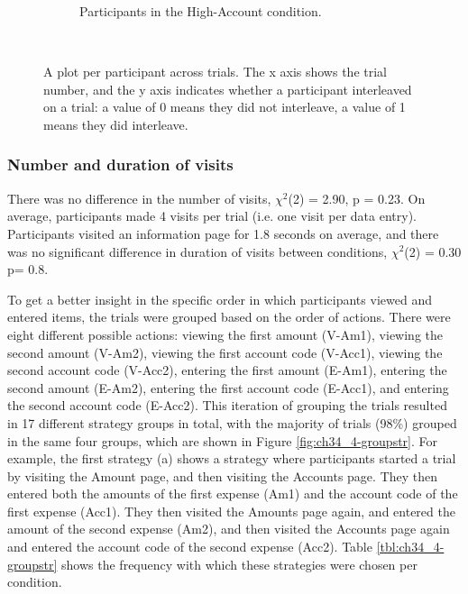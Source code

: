 \begin{figure}[!htbp]
\begin{subfigure}[b]{0.5\textwidth}
        \caption{Participants in the High-Account condition.}
    \end{subfigure}
    ~ %
    \caption{A plot per participant across trials. The x axis shows the trial number, and the y axis indicates whether a participant interleaved on a trial: a value of 0 means they did not interleave, a value of 1 means they did interleave.}\label{fig:ch34_4-plotpp}
\end{figure}

\subsubsection{Number and duration of visits}
There was no difference in the number of visits, $\chi^2$(2) = 2.90, p = 0.23. On average, participants made 4 visits per trial (i.e. one visit per data entry). Participants visited an information page for 1.8 seconds on average, and there was no significant difference in duration of visits between conditions, $\chi^2$(2) = 0.30 p= 0.8. 

To get a better insight in the specific order in which participants viewed and entered items, the trials were grouped based on the order of actions. There were eight different possible actions: viewing the first amount (V-Am1), viewing the second amount (V-Am2), viewing the first account code (V-Acc1), viewing the second account code (V-Acc2), entering the first amount (E-Am1), entering the second amount (E-Am2), entering the first account code (E-Acc1), and entering the second account code (E-Acc2). This iteration of grouping the trials resulted in 17 different strategy groups in total, with the majority of trials (98\%) grouped in the same four groups, which are shown in Figure \ref{fig:ch34_4-groupstr}. For example, the first strategy (a) shows a strategy where participants started a trial by visiting the Amount page, and then visiting the Accounts page. They then entered both the amounts of the first expense (Am1) and the account code of the first expense (Acc1). They then visited the Amounts page again, and entered the amount of the second expense (Am2), and then visited the Accounts page again and entered the account code of the second expense (Acc2). Table \ref{tbl:ch34_4-groupstr} shows the frequency with which these strategies were chosen per condition.

